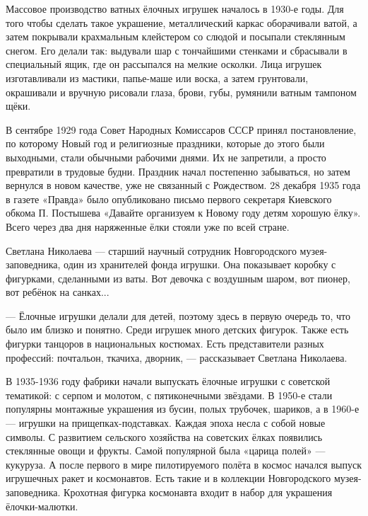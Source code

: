 
Массовое производство ватных ёлочных игрушек началось в 1930-е годы. Для того
чтобы сделать такое украшение, металлический каркас оборачивали ватой, а затем
покрывали крахмальным клейстером со слюдой и посыпали стеклянным снегом. Его
делали так: выдували шар с тончайшими стенками и сбрасывали в специальный ящик,
где он рассыпался на мелкие осколки. Лица игрушек изготавливали из мастики,
папье-маше или воска, а затем грунтовали, окрашивали и вручную рисовали глаза,
брови, губы, румянили ватным тампоном щёки.

\begin{zznagolos}
В сентябре 1929 года Совет Народных Комиссаров СССР принял постановление, по которому Новый год и религиозные праздники, которые до этого были выходными, стали обычными рабочими днями. Их не запретили, а просто превратили в трудовые будни. Праздник начал постепенно забываться, но затем вернулся в новом качестве, уже не связанный с Рождеством. 28 декабря 1935 года в газете «Правда» было опубликовано письмо первого секретаря Киевского обкома П. Постышева «Давайте организуем к Новому году детям хорошую ёлку». Всего через два дня наряженные ёлки стояли уже по всей стране.	
\end{zznagolos}

Светлана Николаева — старший научный сотрудник Новгородского музея-заповедника,
один из хранителей фонда игрушки. Она показывает коробку с фигурками,
сделанными из ваты. Вот девочка с воздушным шаром, вот пионер, вот ребёнок на
санках...

\begin{zznagolos}
— Ёлочные игрушки делали для детей, поэтому здесь в первую очередь то, что было
им близко и понятно. Среди игрушек много детских фигурок. Также есть фигурки
танцоров в национальных костюмах. Есть представители разных профессий:
почтальон, ткачиха, дворник, — рассказывает Светлана Николаева.	
\end{zznagolos}

В 1935-1936 году фабрики начали выпускать ёлочные игрушки с советской
тематикой: с серпом и молотом, с пятиконечными звёздами. В 1950-е стали
популярны монтажные украшения из бусин, полых трубочек, шариков, а в 1960-е —
игрушки на прищепках-подставках. Каждая эпоха несла с собой новые символы. С
развитием сельского хозяйства на советских ёлках появились стеклянные овощи и
фрукты. Самой популярной была «царица полей» — кукуруза. А после первого в мире
пилотируемого полёта в космос начался выпуск игрушечных ракет и космонавтов.
Есть такие и в коллекции Новгородского музея-заповедника. Крохотная фигурка
космонавта входит в набор для украшения ёлочки-малютки. 
